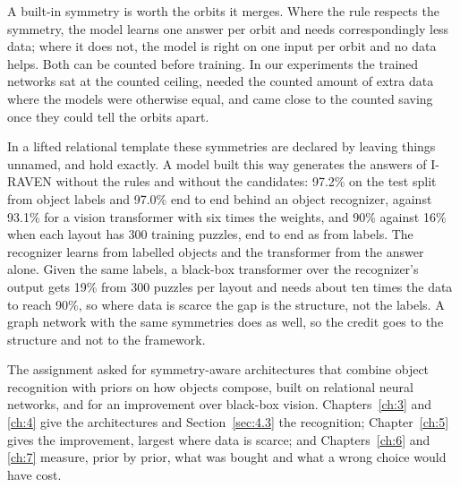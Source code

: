 A built-in symmetry is worth the orbits it merges. Where the rule respects the symmetry, the model learns one answer per orbit and needs correspondingly less data; where it does not, the model is right on one input per orbit and no data helps. Both can be counted before training. In our experiments the trained networks sat at the counted ceiling, needed the counted amount of extra data where the models were otherwise equal, and came close to the counted saving once they could tell the orbits apart.

In a lifted relational template these symmetries are declared by leaving things unnamed, and hold exactly. A model built this way generates the answers of I-RAVEN without the rules and without the candidates: 97.2\% on the test split from object labels and 97.0\% end to end behind an object recognizer, against 93.1\% for a vision transformer with six times the weights, and 90\% against 16\% when each layout has 300 training puzzles, end to end as from labels. The recognizer learns from labelled objects and the transformer from the answer alone. Given the same labels, a black-box transformer over the recognizer's output gets 19\% from 300 puzzles per layout and needs about ten times the data to reach 90\%, so where data is scarce the gap is the structure, not the labels. A graph network with the same symmetries does as well, so the credit goes to the structure and not to the framework.

The assignment asked for symmetry-aware architectures that combine object recognition with priors on how objects compose, built on relational neural networks, and for an improvement over black-box vision. Chapters~\ref{ch:3} and \ref{ch:4} give the architectures and Section~\ref{sec:4.3} the recognition; Chapter~\ref{ch:5} gives the improvement, largest where data is scarce; and Chapters~\ref{ch:6} and \ref{ch:7} measure, prior by prior, what was bought and what a wrong choice would have cost.
